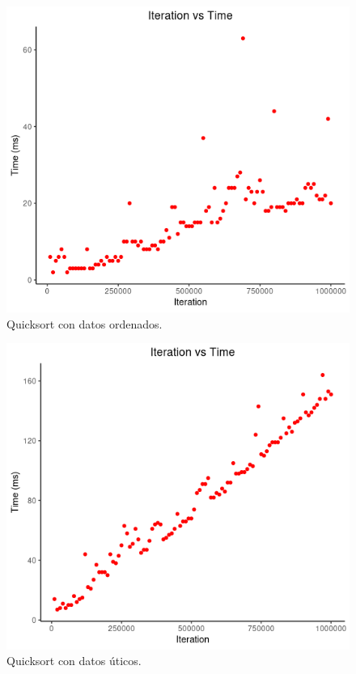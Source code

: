 \documentclass[paper=a4, fontsize=11pt]{scrartcl} %
\numberwithin{equation}{section} %
\numberwithin{figure}{section} %
\numberwithin{table}{section} %
\begin{document}
\begin{figure}
    \includegraphics[width=\linewidth]{quick_ordered.png}
    \caption{Quicksort con datos ordenados.}
\end{figure}

\begin{figure}
    \includegraphics[width=\linewidth]{quick_unique.png}
    \caption{Quicksort con datos úticos.}
\end{figure}
\end{document}
